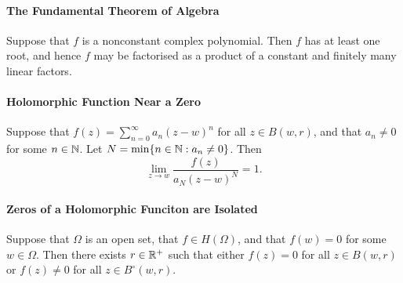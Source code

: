 \paragraph{The Fundamental Theorem of Algebra}
Suppose that \(f\) is a nonconstant complex polynomial. Then \(f\) has at least one root, and hence \(f\) may be factorised as a product of a constant and finitely many linear factors.

\paragraph{Holomorphic Function Near a Zero}
Suppose that \(f(z) = \sum_{n=0}^\infty a_n(z - w)^n\) for all \(z \in B(w,r)\), and that \(a_n \neq 0\) for some \(n \in \mathbb{N}\). Let \(N = \min\{n \in \mathbb{N}: a_n \neq 0\}\). Then
\[\lim_{z \to w} \frac{f(z)}{a_N(z-w)^N} = 1.\]

\paragraph{Zeros of a Holomorphic Funciton are Isolated}
Suppose that \(\Omega\) is an open set, that \(f \in H(\Omega)\), and that \(f(w) = 0\) for some \(w \in \Omega\). Then there exists \(r \in \mathbb{R}^+\) such that either \(f(z) = 0\) for all \(z \in B(w, r)\) or \(f(z) \neq 0\) for all \(z \in B^\circ(w,r)\).